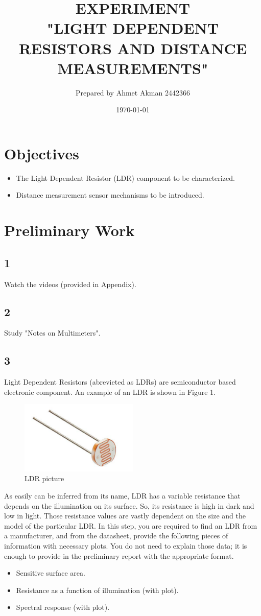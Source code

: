 \documentclass[letterpaper,12pt]{article}
\begin{document}
\title{EXPERIMENT\protect\\"LIGHT DEPENDENT RESISTORS AND DISTANCE MEASUREMENTS"}
\author{Prepared by Ahmet Akman 2442366}
\date{\today}
\maketitle
\section*{Objectives}
\begin{itemize}
	\item The Light Dependent Resistor (LDR) component to be characterized.
	\item Distance measurement sensor mechanisms to be introduced.
\end{itemize}
\section*{Preliminary Work}
\subsection*{1}
Watch the  videos (provided in Appendix).
\subsection*{2}
Study "Notes on Multimeters".
\subsection*{3}
Light Dependent Resistors (abrevieted as LDRs) are semiconductor based electronic component. An example of an LDR is shown in Figure 1. 
\begin{figure}[H]
	\centering
	\includegraphics[width=0.5\textwidth]{LDR_photo.png}
	\caption{LDR picture}
\end{figure} 
As easily can be inferred from its name, LDR has a variable resistance that depends on the illumination on its surface. So, its resistance is high in dark and low in light. Those resistance values are vastly dependent on the size and the model of the particular LDR. In this step, you are required to find an LDR from a manufacturer, and from the datasheet, provide the following pieces of information with necessary plots. You do not need to explain those data; it is enough to provide in the preliminary report with the appropriate format.
\begin{itemize}
	\item Sensitive surface area.
	\item Resistance as a function of illumination (with plot).
	\item Spectral response (with plot). 
\end{itemize}   
\end{document}
